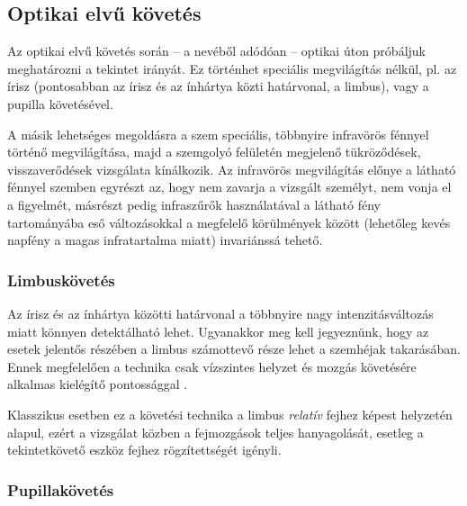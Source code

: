 \subsection{Optikai elvű követés}\label{sect:optikai}

Az optikai elvű követés során -- a nevéből adódóan -- optikai úton próbáljuk meghatározni a tekintet irányát. Ez történhet speciális megvilágítás nélkül, pl. az írisz (pontosabban az írisz és az ínhártya közti határvonal, a limbus), vagy a pupilla követésével.

A másik lehetséges megoldásra a szem speciális, többnyire infravörös fénnyel történő megvilágítása, majd a szemgolyó felületén megjelenő tükröződések, visszaverődések vizsgálata kínálkozik. Az infravörös megvilágítás előnye a látható fénnyel szemben egyrészt az, hogy nem zavarja a vizsgált személyt, nem vonja el a figyelmét, másrészt pedig infraszűrők használatával a látható fény tartományába eső változásokkal a megfelelő körülmények között (lehetőleg kevés napfény a magas infratartalma miatt) invariánssá tehető.

\subsubsection{Limbuskövetés}\label{sect:limbusz}

Az írisz és az ínhártya közötti határvonal a többnyire nagy intenzitásváltozás miatt könnyen detektálható lehet. Ugyanakkor meg kell jegyeznünk, hogy az esetek jelentős részében a limbus számottevő része lehet a szemhéjak takarásában. Ennek megfelelően a technika csak vízszintes helyzet és mozgás követésére alkalmas kielégítő pontossággal \cite{scott}.

Klasszikus esetben ez a követési technika a limbus \emph{relatív} fejhez képest helyzetén alapul, ezért a vizsgálat közben a fejmozgások teljes hanyagolását, esetleg a tekintetkövető eszköz fejhez rögzítettségét igényli.

\subsubsection{Pupillakövetés}\label{sect:pupilla}

